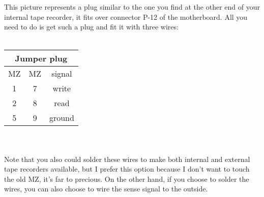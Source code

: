 This picture represents a plug similar to the one you find at the other end
of your internal tape recorder, it fits over connector P-12 of the motherboard.
All you need to do is get such a plug and fit it with three wires: \\ \\
\begin{tabular}{c|c|c}
\multicolumn{3}{c}{Jumper plug} \\
\hline
MZ & MZ & signal \\
\hline
1 & 7 & write \\
2 & 8 & read \\
5 & 9 & ground \\
\end{tabular} \\ \\
Note that you also could solder these wires to make both internal and external
tape recorders available, but I prefer this option because I don't want to 
touch the old MZ, it's far to precious. On the other hand, if you choose to
solder the wires, you can also choose to wire the sense signal to the outside.

